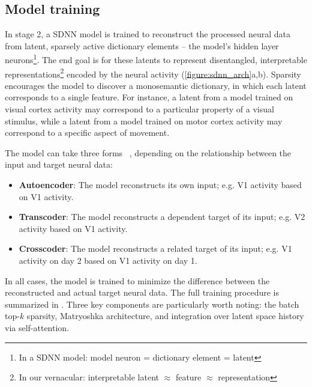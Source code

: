 \subsection{Model training}

In stage 2, a SDNN model is trained to reconstruct the processed neural data from latent, sparsely active dictionary elements -- the model's hidden layer neurons\footnote{In a SDNN model: model neuron = dictionary element = latent}. The end goal is for these latents to represent disentangled, interpretable representations\footnote{In our vernacular: interpretable latent $\approx$ feature $\approx$ representation} encoded by the neural activity (\autoref{figure:sdnn_arch}a,b). Sparsity encourages the model to discover a monosemantic dictionary, in which each latent corresponds to a single feature. For instance, a latent from a model trained on visual cortex activity may correspond to a particular property of a visual stimulus, while a latent from a model trained on motor cortex activity may correspond to a specific aspect of movement.

The model can take three forms ~\cite{lindsey_2024_crosscoders}, depending on the relationship between the input and target neural data:
\begin{itemize}[nosep, leftmargin=1em, topsep=-0.5em]
    \item \textbf{Autoencoder}: The model reconstructs its own input; e.g. V1 activity based on V1 activity.
    \item \textbf{Transcoder}: The model reconstructs a dependent target of its input; e.g. V2 activity based on V1 activity.
    \item \textbf{Crosscoder}: The model reconstructs a related target of its input; e.g. V1 activity on day 2 based on V1 activity on day 1.
\end{itemize}
In all cases, the model is trained to minimize the difference between the reconstructed and actual target neural data. The full training procedure is summarized in . Three key components are particularly worth noting: the batch top-$k$ sparsity, Matryoshka architecture, and integration over latent space history via self-attention.

